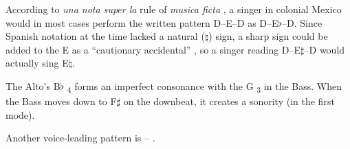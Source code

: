 \documentclass{article}
\newcommand{\octave}[1]{%
	\textsubscript{#1}%
}
\newcommand{\fl}{$\flat$}
\newcommand{\sh}{$\sharp$}
\newcommand{\na}{$\natural$}
\newcommand{\musfig}[2]{%
	\Takt{#1}{#2}%
}
\newcommand{\bl}{\hphantom{$\sharp$}}
\newcommand{\term}[1]{%
	\emph{#1}%
}
\newcommand{\socalled}[1]{%
	\enquote{#1}%
}
\begin{document}
According to \term{una nota super la} rule of \term{musica ficta}, a singer in colonial Mexico would in most cases perform the written pattern D--E--D as D--E\fl--D. 
Since Spanish notation at the time lacked a natural (\na) sign, a sharp sign could be added to the E as a \socalled{cautionary accidental}, so a singer reading D--E\sh--D would actually sing E\na.

The Alto's B\fl\octave{4} forms an imperfect consonance with the G\octave{3} in the Bass.
When the Bass moves down to F\sh{} on the downbeat, it creates a \musfig{\fl 6}{\sh 3} sonority (in the first mode).

Another voice-leading pattern is \musfig{\fl 6}{\bl 3}--\musfig{5}{3}.
\end{document}
